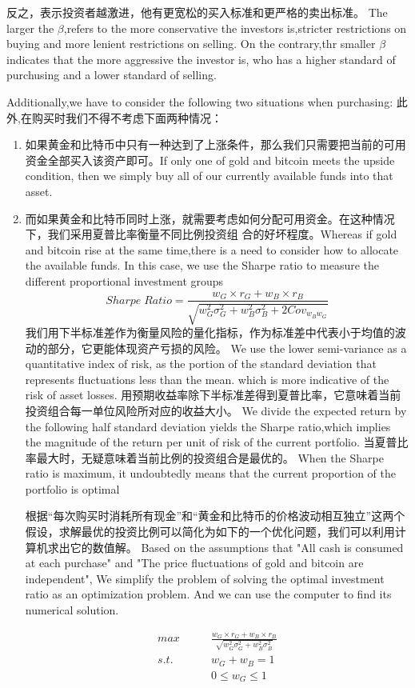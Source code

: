 \documentclass{mcmthesis}
\begin{document}
反之，表示投资者越激进，他有更宽松的买入标准和更严格的卖出标准。
The larger the $\beta $,refers to the more conservative the investors is,stricter restrictions on buying and more lenient restrictions on selling.
On the contrary,thr smaller $\beta $ indicates that the more aggressive the investor is, who has a higher standard of purchusing and a lower standard of selling.


Additionally,we have to consider the following two situations when purchasing:
此外,在购买时我们不得不考虑下面两种情况：
\begin{enumerate}
  \item 如果黄金和比特币中只有一种达到了上涨条件，那么我们只需要把当前的可用资金全部买入该资产即可。If only one of gold and bitcoin meets the upside condition, then we simply buy all of our currently available funds into that asset.
  \item 而如果黄金和比特币同时上涨，就需要考虑如何分配可用资金。在这种情况下，我们采用夏普比率衡量不同比例投资组
  合的好坏程度。Whereas if gold and bitcoin rise at the same time,there is a need to consider how to allocate the available funds. 
  In this case, we use the Sharpe ratio to measure the different proportional investment groups
$$ Sharpe \; Ratio=\frac{w_G\times r_G+w_B\times r_B}{\sqrt{w_G^2 \sigma _G^2 + w_B^2 \sigma _B^2+2Cov_{w_B w_G}}}$$
  我们用下半标准差作为衡量风险的量化指标，作为标准差中代表小于均值的波动的部分，它更能体现资产亏损的风险。
We use the lower semi-variance as a quantitative index of risk, as the portion of the standard deviation that represents fluctuations less than the mean.
which is more indicative of the risk of asset losses.
  用预期收益率除下半标准差得到夏普比率，它意味着当前投资组合每一单位风险所对应的收益大小。
We divide the expected return by the following half standard deviation yields the Sharpe ratio,which implies the magnitude of the return per unit of risk of the current portfolio.
  当夏普比率最大时，无疑意味着当前比例的投资组合是最优的。
When the Sharpe ratio is maximum, it undoubtedly means that the current proportion of the portfolio is optimal

  根据“每次购买时消耗所有现金”和“黄金和比特币的价格波动相互独立”这两个假设，求解最优的投资比例可以简化为如下的一个优化问题，我们可以利用计算机求出它的数值解。
Based on the assumptions that "All cash is consumed at each purchase" and "The price fluctuations of gold and bitcoin are independent", 
We simplify the problem of solving the optimal investment ratio as an optimization problem.
And we can use the computer to find its numerical solution.

\begin{align*}
  max \qquad & \frac{w_G\times r_G+w_B\times r_B}{\sqrt{w_G^2 \sigma _G^2 + w_B^2 \sigma _B^2}}\\
  s.t. \quad & w_G+w_B=1\\
  & 0 \le w_G \le 1 \\
\end{align*}
\end{enumerate}
\end{document}

